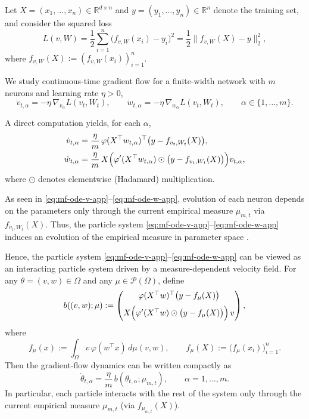 Let $X=(x_1,\dots,x_n)\in\mathbb R^{d\times n}$ and
$y=(y_1,\ldots,y_n)\in\mathbb R^n$ denote the training set, and consider the
squared loss
\[
	L(v,W)
	=
	\frac12\sum_{i=1}^n\bigl(f_{v,W}(x_i)-y_i\bigr)^2
	=
	\frac12\|f_{v,W}(X)-y\|_2^2,
\]
where $f_{v,W}(X):=(f_{v,W}(x_i))_{i=1}^n$.

We study continuous-time gradient flow for a finite-width network with $m$
neurons and learning rate $\eta>0$,
\[
	\dot v_{t,\alpha}
	=
	-\eta\,\nabla_{v_\alpha}L(v_t,W_t),
	\qquad
	\dot w_{t,\alpha}
	=
	-\eta\,\nabla_{w_\alpha}L(v_t,W_t),
	\qquad
	\alpha\in\{1,\dots,m\}.
\]

A direct computation yields, for each $\alpha$,
\begin{align}
	\dot v_{t, \alpha}
	 & =
	\frac{\eta}{m}\,
	\varphi(X^\top w_{t,\alpha})^\top
	\bigl(y-f_{v_t,W_t}(X)\bigr),
	\label{eq:mf-ode-v-app} \\
	\dot w_{t,\alpha}
	 & =
	\frac{\eta}{m}\,
	X\Bigl(
	\varphi'(X^\top w_{t,\alpha})
	\odot
	\bigl(y-f_{v_t,W_t}(X)\bigr)
	\Bigr)v_{t,\alpha},
	\label{eq:mf-ode-w-app}
\end{align}
where $\odot$ denotes elementwise (Hadamard) multiplication.

As seen in \eqref{eq:mf-ode-v-app}--\eqref{eq:mf-ode-w-app}, evolution of
each neuron depends on the parameters only through the current empirical
measure $\mu_{m,t}$ via $f_{v_t,W_t}(X)$. Thus, the particle system
\eqref{eq:mf-ode-v-app}--\eqref{eq:mf-ode-w-app} induces an evolution of the
empirical measure in parameter space \citep{Mei2018meanfieldview,Rotskoff_2022}.

Hence, the particle system \eqref{eq:mf-ode-v-app}--\eqref{eq:mf-ode-w-app}
can be viewed as an interacting particle system driven by a measure-dependent
velocity field. For any $\theta=(v,w)\in\Omega$ and any $\mu\in\mathcal
	P(\Omega)$, define
\[
	b((v,w);\mu)
	:=
	\begin{pmatrix}
		\varphi(X^\top w)^\top\bigl(y-f_\mu(X)\bigr) \\[2mm]
		X\Bigl(\varphi'(X^\top w)\odot\bigl(y-f_\mu(X)\bigr)\Bigr)\,v
	\end{pmatrix},
\]
where
\[
	f_\mu(x):=\int_\Omega v\,\varphi(w^\top x)\,d\mu(v,w),
	\qquad
	f_\mu(X):=\bigl(f_\mu(x_i)\bigr)_{i=1}^n.
\]
Then the gradient-flow dynamics can be written compactly as
\[
	\dot\theta_{t,\alpha}
	=
	\frac{\eta}{m}\,b(\theta_{t,\alpha};\mu_{m,t}),
	\qquad \alpha=1,\dots,m.
\]
In particular, each particle interacts with the rest of the system only through the
current empirical measure $\mu_{m,t}$ (via $f_{\mu_{m,t}}(X)$).

